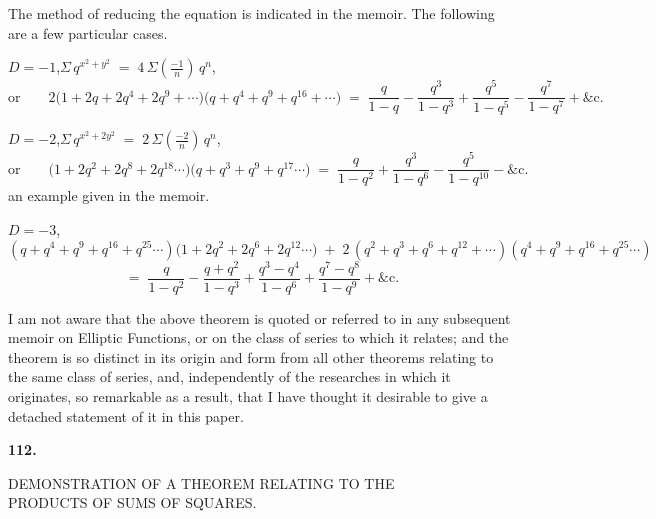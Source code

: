 \documentclass[11pt]{article}
\begin{document}
The method of reducing the equation is indicated in the memoir. The following are a few particular cases.

\medskip

\noindent $D = -1$,\quad $\displaystyle\Sigma\, q^{x^{2}+y^{2}} \;=\; 4\,\Sigma\!\left(\tfrac{-1}{n}\right)\,q^{n}$,
\[
\text{or}\qquad 2\bigl(1 + 2q + 2q^{4} + 2q^{9} + \cdots\bigr)\bigl(q + q^{4} + q^{9} + q^{16} + \cdots\bigr)
\;=\; \frac{q}{1-q} - \frac{q^{3}}{1-q^{3}} + \frac{q^{5}}{1-q^{5}} - \frac{q^{7}}{1-q^{7}} + \&\text{c.}
\]

\medskip

\noindent $D = -2$,\quad $\displaystyle\Sigma\, q^{x^{2} + 2 y^{2}} \;=\; 2\,\Sigma\!\left(\tfrac{-2}{n}\right)\,q^{n}$,
\[
\text{or}\qquad \bigl(1 + 2q^{2} + 2q^{8} + 2q^{18}\cdots\bigr)\bigl(q + q^{3} + q^{9} + q^{17}\cdots\bigr)
\;=\; \frac{q}{1-q^{2}} + \frac{q^{3}}{1-q^{6}} - \frac{q^{5}}{1-q^{10}} - \&\text{c.}
\]
an example given in the memoir.

\medskip

\noindent $D = -3$,
\[
(q + q^{4} + q^{9} + q^{16} + q^{25}\cdots)\bigl(1 + 2 q^{2} + 2 q^{6} + 2 q^{12}\cdots\bigr)
\;+\; 2\,(q^{2} + q^{3} + q^{6} + q^{12} + \cdots)(q^{4} + q^{9} + q^{16} + q^{25}\cdots)
\]
\[
\;=\; \frac{q}{1-q^{2}} - \frac{q + q^{2}}{1-q^{3}} + \frac{q^{3} - q^{4}}{1-q^{6}} + \frac{q^{7} - q^{8}}{1-q^{9}} + \&\text{c.}
\]

\medskip

\noindent I am not aware that the above theorem is quoted or referred to in any subsequent memoir on Elliptic Functions, or on the class of series to which it relates; and the theorem is so distinct in its origin and form from all other theorems relating to the same class of series, and, independently of the researches in which it originates, so remarkable as a result, that I have thought it desirable to give a detached statement of it in this paper.

\clearpage


\begin{center}\textbf{112.}\par\medskip
{\large DEMONSTRATION OF A THEOREM RELATING TO THE\\
PRODUCTS OF SUMS OF SQUARES.}
\end{center}
\end{document}
